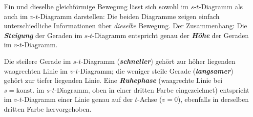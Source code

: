 \documentclass[addpoints,11pt,a4paper]{exam}
\begin{document}
\begin{theoriebox}
Ein und dieselbe gleichförmige Bewegung lässt sich sowohl im
$s$-$t$-Diagramm als auch im $v$-$t$-Diagramm darstellen: Die beiden
Diagramme zeigen einfach unterschiedliche Informationen über \emph{dieselbe}
Bewegung. Der Zusammenhang: Die \textbf{\emph{Steigung}} der Geraden im
$s$-$t$-Diagramm entspricht genau der \textbf{\emph{Höhe}} der Geraden im
$v$-$t$-Diagramm.

\begin{center}
\end{center}

Die steilere Gerade im $s$-$t$-Diagramm (\textbf{\emph{schneller}}) gehört
zur höher liegenden waagrechten Linie im $v$-$t$-Diagramm; die weniger
steile Gerade (\textbf{\emph{langsamer}}) gehört zur tiefer liegenden
Linie. Eine \textbf{\emph{Ruhephase}} (waagrechte Linie bei $s=\text{konst.}$
im $s$-$t$-Diagramm, oben in einer dritten Farbe eingezeichnet) entspricht
im $v$-$t$-Diagramm einer Linie genau auf der $t$-Achse ($v=0$), ebenfalls
in derselben dritten Farbe hervorgehoben.
\end{theoriebox}
\end{document}

